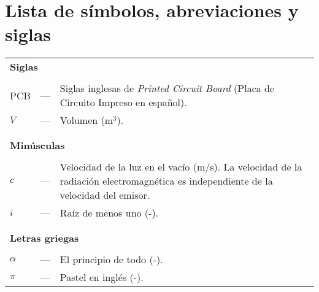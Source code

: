 \chapter*{Lista de símbolos, abreviaciones y siglas}\label{LDS}

\begin{longtable}{lcp{} }
\multicolumn{3}{l}{\textbf{Siglas}}\\
\\
PCB & --- & Siglas inglesas de \textit{Printed Circuit Board} (Placa de Circuito Impreso en español).\\
$V$ & --- & Volumen (m$^3$).\\
\\
\\
\multicolumn{3}{l}{\textbf{Minúsculas}}\\
\\
$c$ & --- & Velocidad de la luz en el vacío (m/s). La velocidad de la radiación electromagnética es independiente de la velocidad del emisor.\\
$i$ & --- & Raíz de menos uno (-).\\
\\
\\
\multicolumn{3}{l}{\textbf{Letras griegas}}\\
\\
$\alpha$ & --- & El principio de todo (-).\\
$\pi$ & --- & Pastel en inglés (-).\\
\end{longtable}

